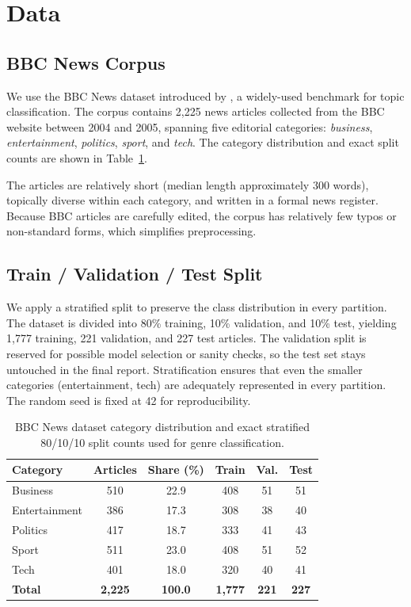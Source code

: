 \section{Data}
\label{sec:data}

\subsection{BBC News Corpus}
We use the BBC News dataset introduced by \citet{greene2006practical}, a widely-used benchmark for topic classification. The corpus contains 2,225 news articles collected from the BBC website between 2004 and 2005, spanning five editorial categories: \textit{business}, \textit{entertainment}, \textit{politics}, \textit{sport}, and \textit{tech}. The category distribution and exact split counts are shown in Table~\ref{tab:dataset}.

The articles are relatively short (median length approximately 300 words), topically diverse within each category, and written in a formal news register. Because BBC articles are carefully edited, the corpus has relatively few typos or non-standard forms, which simplifies preprocessing.

\subsection{Train / Validation / Test Split}

We apply a stratified split to preserve the class distribution in every partition. The dataset is divided into 80\% training, 10\% validation, and 10\% test, yielding 1,777 training, 221 validation, and 227 test articles. The validation split is reserved for possible model selection or sanity checks, so the test set stays untouched in the final report. Stratification ensures that even the smaller categories (entertainment, tech) are adequately represented in every partition. The random seed is fixed at 42 for reproducibility.

\begin{table}[!htbp]
\centering
\small
\setlength{\tabcolsep}{3.8pt}
\begin{tabular}{lccccc}
\toprule
\textbf{Category} & \textbf{Articles} & \textbf{Share (\%)} & \textbf{Train} & \textbf{Val.} & \textbf{Test} \\
\midrule
Business      & 510 & 22.9 & 408 & 51 & 51 \\
Entertainment & 386 & 17.3 & 308 & 38 & 40 \\
Politics      & 417 & 18.7 & 333 & 41 & 43 \\
Sport         & 511 & 23.0 & 408 & 51 & 52 \\
Tech          & 401 & 18.0 & 320 & 40 & 41 \\
\midrule
\textbf{Total} & \textbf{2,225} & \textbf{100.0} & \textbf{1,777} & \textbf{221} & \textbf{227} \\
\bottomrule
\end{tabular}
\caption{BBC News dataset category distribution and exact stratified 80/10/10 split counts used for genre classification.}
\label{tab:dataset}
\end{table}

